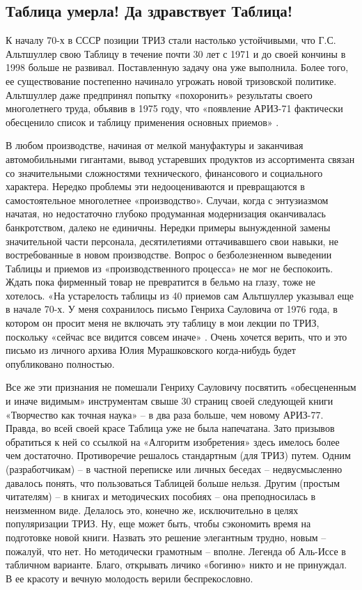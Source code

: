 \documentclass[11pt,a4paper]{article}
\begin{document}
\subsection*{Таблица умерла! Да здравствует Таблица!}

К началу 70-х в СССР позиции ТРИЗ стали настолько устойчивыми, что
Г.С. Альтшуллер свою Таблицу в течение почти 30 лет с 1971 и до своей кончины
в 1998 больше не развивал. Поставленную задачу она уже выполнила. Более того,
ее существование постепенно начинало угрожать новой тризовской политике.
Альтшуллер даже предпринял попытку «похоронить» результаты своего многолетнего
труда, объявив в 1975 году, что «появление АРИЗ-71 фактически обесценило
список и таблицу применения основных приемов» \cite{Altshuller1975}.

В любом производстве, начиная от мелкой мануфактуры и заканчивая
автомобильными гигантами, вывод устаревших продуктов из ассортимента связан со
значительными сложностями технического, финансового и социального характера.
Нередко проблемы эти недооцениваются и превращаются в самостоятельное
многолетнее «производство». Случаи, когда с энтузиазмом начатая, но
недостаточно глубоко продуманная модернизация оканчивалась банкротством,
далеко не единичны. Нередки примеры вынужденной замены значительной части
персонала, десятилетиями оттачивавшего свои навыки, не востребованные в новом
производстве. Вопрос о безболезненном выведении Таблицы и приемов из
«производственного процесса» не мог не беспокоить. Ждать пока фирменный товар
не превратится в бельмо на глазу, тоже не хотелось. «На устарелость таблицы из
40 приемов сам Альтшуллер указывал еще в начале 70-х. У меня сохранилось
письмо Генриха Сауловича от 1976 года, в котором он просит меня не включать
эту таблицу в мои лекции по ТРИЗ, поскольку «сейчас все видится совсем иначе»
\cite{Murashkovsky2006}. Очень хочется верить, что и это письмо из личного
архива Юлия Мурашковского когда-нибудь будет опубликовано полностью.

Все же эти признания не помешали Генриху Сауловичу посвятить «обесцененным и
иначе видимым» инструментам свыше 30 страниц своей следующей книги «Творчество
как точная наука» \cite{Altshuller1979} -- в два раза больше, чем новому
АРИЗ-77. Правда, во всей своей красе Таблица уже не была напечатана. Зато
призывов обратиться к ней со ссылкой на «Алгоритм изобретения» здесь имелось
более чем достаточно. Противоречие решалось стандартным (для ТРИЗ) путем.
Одним (разработчикам) -- в частной переписке или личных беседах --
недвусмысленно давалось понять, что пользоваться Таблицей больше нельзя.
Другим (простым читателям) -- в книгах и методических пособиях -- она
преподносилась в неизменном виде. Делалось это, конечно же, исключительно в
целях популяризации ТРИЗ. Ну, еще может быть, чтобы сэкономить время на
подготовке новой книги. Назвать это решение элегантным трудно, новым --
пожалуй, что нет. Но методически грамотным -- вполне. Легенда об Аль-Иссе в
табличном варианте. Благо, открывать личико «богиню» никто и не принуждал. В
ее красоту и вечную молодость верили беспрекословно.
\end{document}
